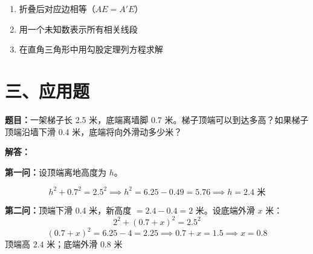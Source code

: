 \documentclass[12pt, a4paper]{ctexart}
\begin{document}
\begin{tipbox}
\begin{enumerate}[leftmargin=1.5em, itemsep=2pt]
  \item 折叠后对应边相等（$AE = A'E$）
  \item 用一个未知数表示所有相关线段
  \item 在直角三角形中用勾股定理列方程求解
\end{enumerate}
\end{tipbox}

\section*{\textcolor{apppurple}{三、应用题}}

\begin{appbox}
\textbf{题目：}一架梯子长 2.5 米，底端离墙脚 0.7 米。梯子顶端可以到达多高？如果梯子顶端沿墙下滑 0.4 米，底端将向外滑动多少米？

\vspace{6pt}
\textbf{解答：}

\textbf{第一问：}设顶端离地高度为 $h$。
\begin{center}
\end{center}

\[
h^2 + 0.7^2 = 2.5^2 \implies h^2 = 6.25 - 0.49 = 5.76 \implies h = 2.4 \text{ 米}
\]

\textbf{第二问：}顶端下滑 0.4 米，新高度 $= 2.4 - 0.4 = 2$ 米。设底端外滑 $x$ 米：
\[
2^2 + (0.7+x)^2 = 2.5^2
\]
\[
(0.7+x)^2 = 6.25 - 4 = 2.25 \implies 0.7+x = 1.5 \implies x = 0.8
\]
$\boxed{\text{顶端高 } 2.4 \text{ 米；底端外滑 } 0.8 \text{ 米}}$
\end{appbox}
\end{document}
